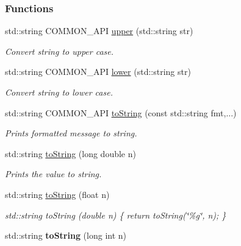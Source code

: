 \subsubsection*{Functions}
\begin{DoxyCompactItemize}
\item 
std::string COMMON\_\-API \hyperlink{group__CommonFunctions_gafb844ea13cbc3a3596026448ace0a808}{upper} (std::string str)
\begin{DoxyCompactList}\small\item\em Convert string to upper case. \item\end{DoxyCompactList}\item 
std::string COMMON\_\-API \hyperlink{group__CommonFunctions_ga2f5c59584246fec7dff2208f6ec04fa9}{lower} (std::string str)
\begin{DoxyCompactList}\small\item\em Convert string to lower case. \item\end{DoxyCompactList}\item 
std::string COMMON\_\-API \hyperlink{group__CommonFunctions_ga0c99deaa2f9c487d645d3d6807fe899c}{toString} (const std::string fmt,...)
\begin{DoxyCompactList}\small\item\em Prints formatted message to string. \item\end{DoxyCompactList}\item 
std::string \hyperlink{group__CommonFunctions_ga299afbef7c9abdc86c2a2b4c88350ede}{toString} (long double n)
\begin{DoxyCompactList}\small\item\em Prints the value to string. \item\end{DoxyCompactList}\item 
std::string \hyperlink{group__CommonFunctions_gaabbea50ae85171a270c0ca228f8cc673}{toString} (float n)
\begin{DoxyCompactList}\small\item\em std::string toString (double n) \{ return toString(\char`\"{}\%g\char`\"{}, n); \} \item\end{DoxyCompactList}\item 
\hypertarget{group__CommonFunctions_ga8610adff58d28f1b7f2b1cdc2faf1b3a}{
std::string {\bfseries toString} (long int n)}
\label{group__CommonFunctions_ga8610adff58d28f1b7f2b1cdc2faf1b3a}


\end{DoxyCompactItemize}

